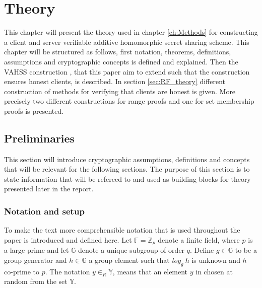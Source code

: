 \chapter{Theory}
\label{ch:theory}
This chapter will present the theory used in chapter \ref{ch:Methods} for constructing a client and server verifiable additive homomorphic secret sharing scheme.  This chapter will be structured as follows, first  notation, theorems, definitions, assumptions  and cryptographic concepts is defined and explained. Then the VAHSS construction \cite{SumItUp}, that this paper aim to extend such that the construction ensures honest clients, is described. In section \ref{sec:RF_theory} different construction of methods for verifying that clients are honest is given. More precisely two different constructions for range proofs and one for  set membership proofs is presented. 


\section{Preliminaries}
This section will introduce cryptographic assumptions, definitions and concepts that will be relevant for the following sections. The purpose of this section is to state information that will be refereed to and used as building blocks for theory presented later in the report. 

\subsection*{Notation and setup}
To make the text more comprehensible notation that is used throughout the paper is introduced and defined here.  
Let $\mathds{F}=\mathds{Z}_p$ denote a finite field, where $p$ is a large prime and let $\mathds{G}$ denote a unique subgroup of order $q$.  Define $g\in\mathds{G}$ to be a group generator and $h\in\mathds{G}$ a group element such that  $log_g\:h$ is unknown and $h$ co-prime to $p$. 
The notation $y\in_R\mathds{Y}$, means that an element $y$ in chosen at random from the set $\mathds{Y}$.

